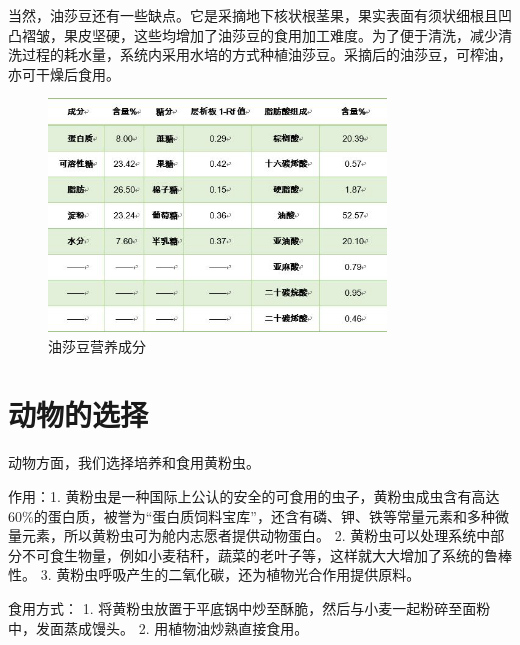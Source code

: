当然，油莎豆还有一些缺点。它是采摘地下核状根茎果，果实表面有须状细根且凹凸褶皱，果皮坚硬，这些均增加了油莎豆的食用加工难度。为了便于清洗，减少清洗过程的耗水量，系统内采用水培的方式种植油莎豆。采摘后的油莎豆，可榨油，亦可干燥后食用。

\begin{figure}[H]
  \centering
  \includegraphics[width=0.8\textwidth]{figure/tigernut-nutrition.png}
  \caption{油莎豆营养成分}
  \label{fig:tigernut-nutri}
\end{figure}

\section{动物的选择}
\label{chp:plant:end}
动物方面，我们选择培养和食用黄粉虫。

作用：1. 黄粉虫是一种国际上公认的安全的可食用的虫子，黄粉虫成虫含有高达60\%的蛋白质，被誉为“蛋白质饲料宝库”，还含有磷、钾、铁等常量元素和多种微量元素，所以黄粉虫可为舱内志愿者提供动物蛋白。
2. 黄粉虫可以处理系统中部分不可食生物量，例如小麦秸秆，蔬菜的老叶子等，这样就大大增加了系统的鲁棒性。
3. 黄粉虫呼吸产生的二氧化碳，还为植物光合作用提供原料。

食用方式： 1. 将黄粉虫放置于平底锅中炒至酥脆，然后与小麦一起粉碎至面粉中，发面蒸成馒头。
2. 用植物油炒熟直接食用。
